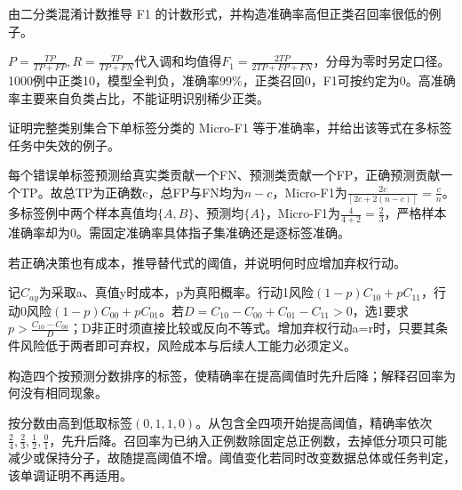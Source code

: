 
\begin{exercises}
\begin{exercise} 由二分类混淆计数推导 F1 的计数形式，并构造准确率高但正类召回率很低的例子。

\begin{solution}
$P=\frac{TP}{TP+FP},R=\frac{TP}{TP+FN}$代入调和均值得$F_1=\frac{2TP}{2TP+FP+FN}$，分母为零时另定口径。1000例中正类10，模型全判负，准确率99\%，正类召回0，F1可按约定为0。高准确率主要来自负类占比，不能证明识别稀少正类。
\end{solution}
\end{exercise}

\begin{exercise} 证明完整类别集合下单标签分类的 Micro-F1 等于准确率，并给出该等式在多标签任务中失效的例子。

\begin{solution}
每个错误单标签预测给真实类贡献一个FN、预测类贡献一个FP，正确预测贡献一个TP。故总TP为正确数c，总FP与FN均为$n-c$，Micro-F1为$\frac{2c}{[2c+2(n-c)]}=\frac{c}{n}$。多标签例中两个样本真值均$\{A,B\}$、预测均$\{A\}$，Micro-F1为$\frac{4}{4+2}=\frac{2}{3}$，严格样本准确率却为0。需固定准确率具体指子集准确还是逐标签准确。
\end{solution}
\end{exercise}

\begin{exercise} 若正确决策也有成本，推导替代式的阈值，并说明何时应增加弃权行动。

\begin{solution}
记$C_{ay}$为采取a、真值y时成本，p为真阳概率。行动1风险$(1-p)C_{10}+pC_{11}$，行动0风险$(1-p)C_{00}+pC_{01}$。若$D=C_{10}-C_{00}+C_{01}-C_{11}>0$，选1要求 $p>\frac{C_{10}-C_{00}}{D}$；D非正时须直接比较或反向不等式。增加弃权行动a=r时，只要其条件风险低于两者即可弃权，风险成本与后续人工能力必须定义。
\end{solution}
\end{exercise}

\begin{exercise} 构造四个按预测分数排序的标签，使精确率在提高阈值时先升后降；解释召回率为何没有相同现象。

\begin{solution}
按分数由高到低取标签$(0,1,1,0)$。从包含全四项开始提高阈值，精确率依次$\frac{2}{4},\frac{2}{3},\frac{1}{2},\frac{0}{1}$，先升后降。召回率为已纳入正例数除固定总正例数，去掉低分项只可能减少或保持分子，故随提高阈值不增。阈值变化若同时改变数据总体或任务判定，该单调证明不再适用。
\end{solution}
\end{exercise}


\end{exercises}
